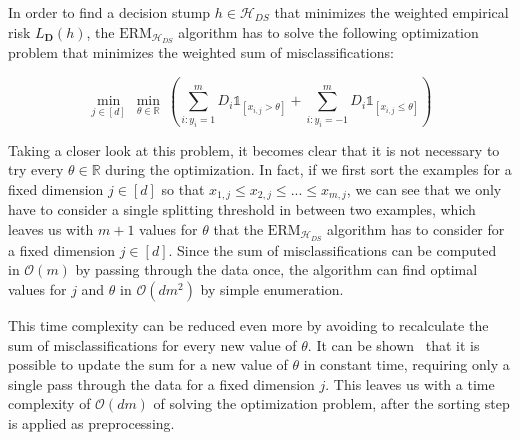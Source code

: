 In order to find a decision stump $h \in \mathcal{H}_{DS}$ that minimizes the weighted empirical risk $L_\mathbf{D}(h)$,
the $\text{ERM}_{\mathcal{H}_{DS}}$ algorithm has to solve
the following optimization problem that minimizes the weighted sum of misclassifications:
\begin{linenomath*}
    $$\min_{j \in \left[ d \right]} \  \min_{\theta \in \mathbb{R}} \ 
        \left( \sum_{i: y_i=1}^m D_i \mathds{1}_{\left[ x_{i, j} > \theta \right]} + 
            \sum_{i: y_i=-1}^m D_i \mathds{1}_{\left[ x_{i, j} \leq \theta \right]} \right)$$
\end{linenomath*}
Taking a closer look at this problem, it becomes clear that it is not necessary to try every $\theta \in \mathbb{R}$
during the optimization.
In fact, if we first sort the examples for a fixed dimension $j \in \left[ d \right]$ so that
$x_{1, j} \leq x_{2, j} \leq ... \leq x_{m, j}$, we can see that we only have to consider a single splitting 
threshold in between two examples, which leaves us with $m+1$ values for $\theta$ that the 
$\text{ERM}_{\mathcal{H}_{DS}}$ algorithm has to consider for a fixed dimension $j \in \left[ d \right]$.
Since the sum of misclassifications can be computed in $\mathcal{O}(m)$ by passing through the data once,
the algorithm can find optimal values for $j$ and $\theta$ in $\mathcal{O}(dm^2)$ by simple enumeration.

This time complexity can be reduced even more by avoiding to recalculate the sum of misclassifications for
every new value of $\theta$. It can be shown~\cite{SSBD14} that it is possible to update the sum for a new
value of $\theta$ in constant time, requiring only a single pass through the data for a fixed dimension $j$.
This leaves us with a time complexity of $\mathcal{O}(dm)$ of solving the optimization problem, after the sorting
step is applied as preprocessing.
